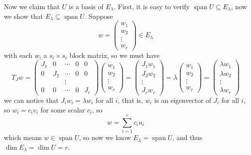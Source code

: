 \documentclass[a4paper]{article}
\theoremstyle{mystyle}
\newcommand{\6}{\partial}
\DeclareMathOperator{\vsspan}{span}
\begin{document}
Now we claim that $U$ is a basis of $E_\lambda$. First, it is easy to verify $\vsspan U \subseteq E_\lambda$, now we show
that $E_\lambda \subseteq \vsspan U$. Suppose
\[
w =
\begin{pmatrix}
    w_1 \\ w_2 \\ \vdots \\ w_r
\end{pmatrix} \in E_\lambda
\] with each $w_i$ a $s_i \times s_i$ block matrix, so we must have
\[
T_J w = \begin{pmatrix}
    J_1 &0 &\cdots &0 &0 \\
    0 &J_2 &\cdots &0 &0\\
    &&\vdots \\ 
    0 &0 &\cdots &0 &J_r
    \end{pmatrix} \begin{pmatrix}
        w_1 \\ w_2 \\ \vdots \\ w_r
    \end{pmatrix} = 
    \begin{pmatrix}
        J_1w_1 \\ J_2w_2 \\ \vdots \\ J_rw_r
    \end{pmatrix} =
    \lambda \begin{pmatrix}
        w_1 \\ w_2 \\ \vdots \\ w_r
    \end{pmatrix}
    =
    \begin{pmatrix}
        \lambda w_1 \\ \lambda w_2 \\ \vdots \\ \lambda w_r
    \end{pmatrix}
\] we can notice that $J_i w_i=\lambda w_i$ for all $i$, that is, $w_i$ is an eigenvector of $J_i$ for all $i$,
so $w_i =c_i v_i$ for some scalar $c_i$, so
\[ 
w=\sum_{i=1}^r c_i u_i
\]
which means $w \in \vsspan U$, so now we know $E_\lambda = \vsspan U$, and thus $\dim E_\lambda = \dim U = r$.
\end{document}
